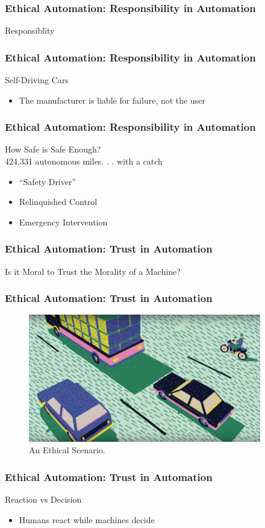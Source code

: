 \begin{frame}
  \frametitle{ Ethical Automation: Responsibility in Automation}
  \Large{Responsiblity}
\end{frame}


\begin{frame}
  \frametitle{ Ethical Automation: Responsibility in Automation}
  {\Large Self-Driving Cars}
  \begin{itemize}
    \item The manufacturer is liable for failure, not the user
  \end{itemize}
\end{frame}


\begin{frame}
  \frametitle{ Ethical Automation: Responsibility in Automation}
  {\Large How Safe is Safe Enough?}\\
  424,331 autonomous miles. . . with a catch
  \begin{itemize}
    \item ``Safety Driver''
    \item Relinquished Control
    \item Emergency Intervention
  \end{itemize}
\end{frame}


\begin{frame}
  \frametitle{ Ethical Automation: Trust in Automation}
  \Large{Is it Moral to Trust the Morality of a Machine?}
\end{frame}


\begin{frame}
  \frametitle{ Ethical Automation: Trust in Automation}
  \begin{figure}[bht]
    \centering
    \includegraphics[width=4.0in]{diagrams/image00}
    \caption{An Ethical Scenario.}
  \end{figure}
\end{frame}


\begin{frame}
  \frametitle{ Ethical Automation: Trust in Automation}
  {\Large Reaction vs Decision}
  \begin{itemize}
    \item Humans react while machines decide
  \end{itemize}
\end{frame}


